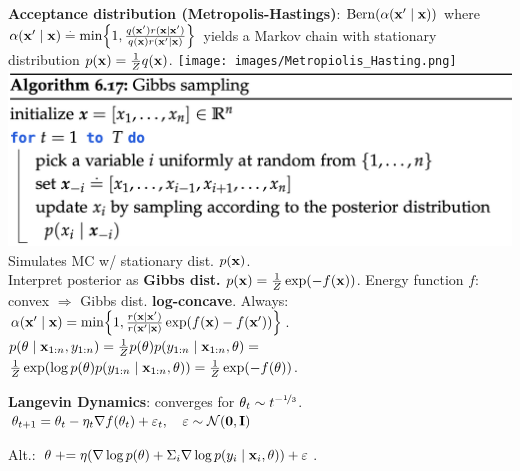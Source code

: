 \textbf{Acceptance distribution (Metropolis-Hastings)}: $\Bern{\alpha(\vxp \mid \vx)}$ where $\alpha(\vxp \mid \vx) \defeq \min \braces*{1, \frac{q(\vxp) r(\vx \mid \vxp)}{q(\vx) r(\vxp \mid \vx)}}$ yields a Markov chain with stationary distribution $p(\mathbf{x}) = \frac{1}{Z} q(\mathbf{x})$.
\texttt{[image: images/Metropiolis\_Hasting.png]}
\includegraphics[width=0.98\linewidth]{images/Gibbs_Sampling.png} 
Simulates MC w/ stationary dist. $p(\mathbf{x})$. \\
Interpret posterior as \textbf{Gibbs dist.} $p(\mathbf{x}) = \frac{1}{Z} \exp(- f(\mathbf{x}))$. Energy function $f$: convex $\Rightarrow$ Gibbs dist. \textbf{log-concave}. Always: $\alpha(\vxp \mid \vx) = \min \braces*{1, \frac{r(\vx \mid \vxp)}{r(\vxp \mid \vx)} \exp(f(\vx) - f(\vxp))}$. \\
$p(\mathbf{\theta} \mid \mathbf{x}_{1:n}, y_{1:n}) = \frac{1}{Z} p(\mathbf{\theta}) p(y_{1:n} \mid \mathbf{x}_{1:n}, \mathbf{\theta}) = $\\
$ \frac{1}{Z} \exp(\log p(\mathbf{\theta}) p(y_{1:n} \mid \mathbf{x}_{1:n}, \mathbf{\theta})) = \frac{1}{Z} \exp(-f(\mathbf{\theta}))$.
\begin{framed}
    \textbf{Langevin Dynamics}: converges for $\mathbf{\theta}_t \sim t^{-\nicefrac{1}{3}}$. \\
    $\vtheta_{t+1} = \vtheta_t - \eta_t \nabla f(\vtheta_t) + \varepsilon_t, \quad \varepsilon \sim \N{\vzero}{\mI}$ \\
\end{framed}
Alt.: $\mathbf{\theta} \mathrel{+}= \eta (\nabla \log p(\mathbf{\theta}) + \Sigma_i \nabla \log p(y_i \mid \mathbf{x}_i, \mathbf{\theta})) + \varepsilon$.